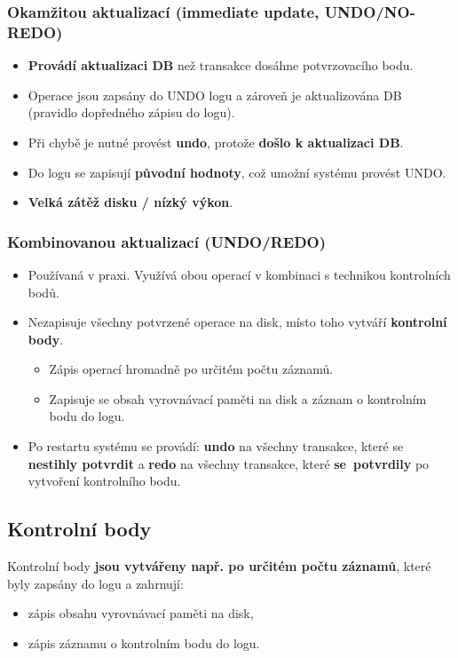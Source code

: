 \subsubsection*{Okamžitou aktualizací (immediate update, UNDO/NO-REDO)}
\begin{itemize}
\item \textbf{Provádí aktualizaci DB} než transakce dosáhne potvrzovacího bodu.
\item Operace jsou zapsány do UNDO logu a zároveň je aktualizována DB (pravidlo dopředného zápisu do logu).
\item Při chybě je nutné provést \textbf{undo}, protože \textbf{došlo k aktualizaci DB}.
\item Do logu se zapisují \textbf{původní hodnoty}, což umožní systému provést UNDO.
\item \textbf{Velká zátěž disku / nízký výkon}.
\end{itemize}
\subsubsection*{Kombinovanou aktualizací (UNDO/REDO)}
\begin{itemize}
\item Používaná v praxi. Využívá obou operací v kombinaci s technikou kontrolních bodů.
\item Nezapisuje všechny potvrzené operace na disk, místo toho vytváří \textbf{kontrolní body}.
\begin{itemize}
\item Zápis operací hromadně po určitém počtu záznamů.
\item Zapisuje se obsah vyrovnávací paměti na disk a záznam o kontrolním bodu do logu.
\end{itemize}
\item Po restartu systému se provádí: \textbf{undo} na všechny transakce, které se \textbf{nestihly potvrdit} a \textbf{redo} na všechny transakce, které \textbf{se potvrdily} po vytvoření kontrolního bodu.
\end{itemize}

\subsection{Kontrolní body}
Kontrolní body \textbf{jsou vytvářeny např. po určitém počtu záznamů}, které byly zapsány do logu a zahrnují:
\begin{itemize}
\item zápis obsahu vyrovnávací paměti na disk,
\item zápis záznamu o kontrolním bodu do logu.
\end{itemize}

